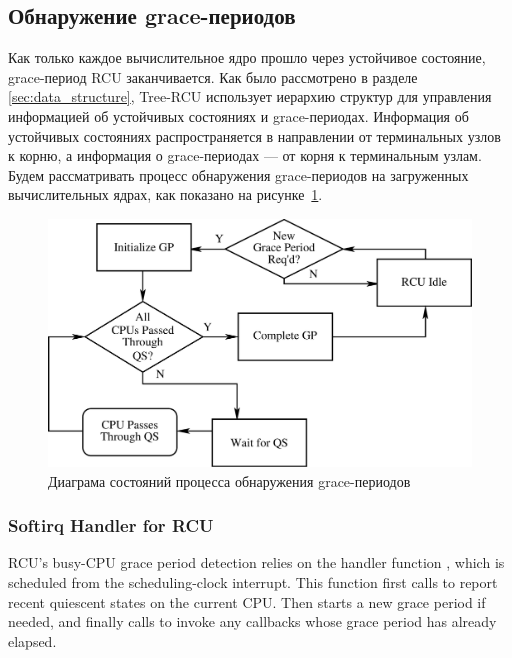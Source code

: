 \subsection{Обнаружение grace-периодов} \label{sec:grace_period}
Как только каждое вычислительное ядро прошло через устойчивое состояние,
grace-период RCU заканчивается.
Как было рассмотрено в разделе \ref{sec:data_structure},
Tree-RCU использует иерархию структур  для
управления информацией об устойчивых состояниях и grace-периодах.
Информация об устойчивых состояниях распространяется в направлении
от терминальных узлов к корню, а информация о grace-периодах ---
от корня к терминальным узлам.
Будем рассматривать процесс обнаружения grace-периодов на загруженных
вычислительных ядрах, как показано на рисунке~\ref{fig:grace_period_state_diagram}.

\begin{figure}[tb]
\centering
\includegraphics[scale=0.25]{grace_period_state_diagram.pdf}
\caption{Диаграма состояний процесса обнаружения grace-периодов}
\label{fig:grace_period_state_diagram}
\end{figure}

\subsubsection{Softirq Handler for RCU} \label{sec:rcu_softirq}
RCU's busy-CPU grace period detection relies on the
 handler function ,
which is scheduled from the scheduling-clock interrupt.
This function first calls
 to report recent quiescent states
on the current CPU.
Then  starts a new grace period if needed,
and finally calls  to invoke any callbacks
whose grace period has already elapsed.

